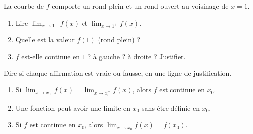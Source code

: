 \documentclass[11pt,a4paper]{article}
\begin{document}
\begin{exercice}
La courbe de $f$ comporte un rond plein et un rond ouvert au voisinage de $x=1$.
\begin{center}
\end{center}
\begin{enumerate}[label=\alph*),leftmargin=2em,itemsep=3pt]
  \item Lire $\displaystyle\lim_{x\to 1^{-}} f(x)$ et $\displaystyle\lim_{x\to 1^{+}} f(x)$.
  \item Quelle est la valeur $f(1)$ (rond plein) ?
  \item $f$ est-elle continue en $1$ ? à gauche ? à droite ? Justifier.
\end{enumerate}
\end{exercice}

\begin{exercice}
Dire si chaque affirmation est vraie ou fausse, en une ligne de justification.
\begin{enumerate}[label=\alph*),leftmargin=2em,itemsep=3pt]
  \item Si $\displaystyle\lim_{x\to x_0^{-}} f(x)=\lim_{x\to x_0^{+}} f(x)$, alors $f$ est continue en $x_0$.
  \item Une fonction peut avoir une limite en $x_0$ sans être définie en $x_0$.
  \item Si $f$ est continue en $x_0$, alors $\displaystyle\lim_{x\to x_0} f(x)=f(x_0)$.
\end{enumerate}
\end{exercice}
\end{document}
